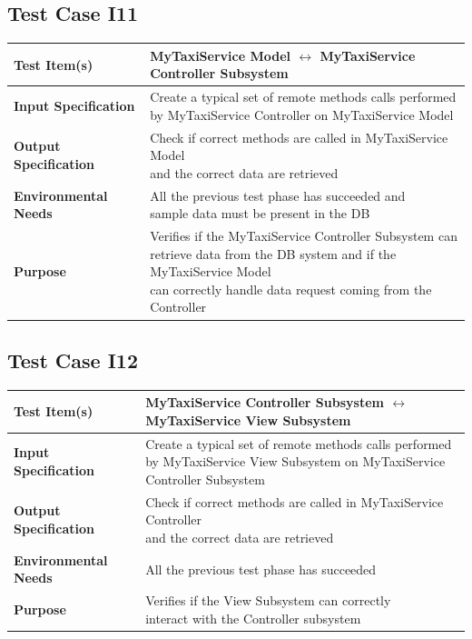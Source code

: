 \documentclass[11pt,titlepage]{article} %
\begin{document}
  \subsection{Test Case I11}
  \begin{table}[H]
    \begin{tabular*}{16cm}{ll}
	\hline
	\textbf{Test Item(s)} & MyTaxiService Model $ \longleftrightarrow $ MyTaxiService Controller Subsystem \\
	\hline
	\textbf{Input Specification} & \pbox{20cm}{Create a typical set of remote methods calls performed \\ by MyTaxiService Controller on MyTaxiService Model} \\
	\hline
	\textbf{Output Specification} & \pbox{20cm}{Check if correct methods are called in MyTaxiService Model \\ and the correct data are retrieved} \\
	\hline
	\textbf{Environmental Needs} & \pbox{20cm}{All the previous test phase has succeeded and \\ sample data must be present in the DB}\\
	\hline
	\textbf{Purpose} & \pbox{20cm}{Verifies if the MyTaxiService Controller Subsystem can \\ retrieve data from the DB system and if the MyTaxiService Model \\ can correctly handle data request coming from the Controller} \\
	\hline
    \end{tabular*}
  \end{table}
  
  \subsection{Test Case I12}
  \begin{table}[H]
    \begin{tabular*}{16cm}{ll}
	\hline
	\textbf{Test Item(s)} & \pbox{20cm}{MyTaxiService Controller Subsystem $ \longleftrightarrow $ \\ MyTaxiService View Subsystem} \\
	\hline
	\textbf{Input Specification} & \pbox{20cm}{Create a typical set of remote methods calls performed\\ by MyTaxiService View Subsystem on MyTaxiService \\ Controller Subsystem}  \\
	\hline
	\textbf{Output Specification} & \pbox{20cm}{Check if correct methods are called in MyTaxiService Controller \\ and the correct data are retrieved} \\
	\hline
	\textbf{Environmental Needs} & All the previous test phase has succeeded\\
	\hline
	\textbf{Purpose} & \pbox{20cm}{Verifies if the View Subsystem can correctly \\ interact with the Controller subsystem} \\
	\hline
    \end{tabular*}
  \end{table}
\end{document}
